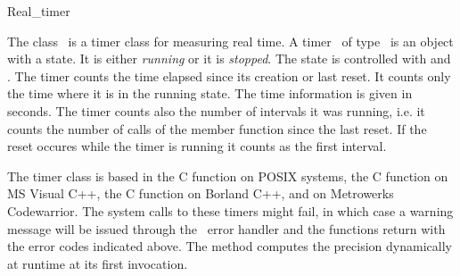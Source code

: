 
\begin{ccRefClass}{Real_timer}

\ccDefinition


The class \ccRefName\ is a timer class for measuring real time.
A timer \ccVar\ of type \ccRefName\ is an object with a state. It is
either {\em running\/} or it is {\em stopped}. The state is controlled
with  and . The timer counts the
time elapsed since its creation or last reset. It counts only the time
where it is in the running state. The time information is given in seconds.
The timer counts also the number of intervals it was running, i.e. it 
counts the number of calls of the  member function since the 
last reset. If the reset occures while the timer is running it counts as the
first interval.

\ccCreation

\ccPropagateThreeToTwoColumns


\ccOperations

\ccGlue
{}
\ccGlue
{}
\ccGlue
{}

\ccGlue
{} 
\ccGlue
{}
\ccGlue
{}

\ccImplementation


The timer class is based in the C function  on
POSIX systems, the C function  on MS Visual C++,
the C function  on Borland C++, and 
on Metrowerks Codewarrior. The system calls to these
timers might fail, in which case a warning message will be issued
through the \cgal\ error handler and the functions return with the
error codes indicated above.  The  method computes the
precision dynamically at runtime at its first invocation.


\end{ccRefClass}

